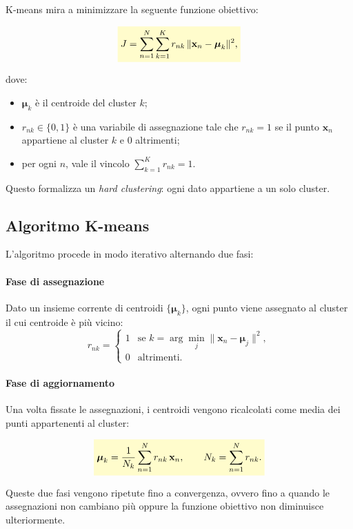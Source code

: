 \documentclass[a4paper,12pt]{report}
\newcommand{\highlight}[1]{%
\colorbox{yellow!20}{$\displaystyle #1$}%
}
\begin{document}
K-means mira a minimizzare la seguente funzione obiettivo:

\[
\highlight{
J = \sum_{n=1}^{N} \sum_{k=1}^{K} r_{nk} \, \lVert \mathbf{x}_n - \boldsymbol{\mu}_k \rVert^2,}
\]

dove:
\begin{itemize}
    \item $\boldsymbol{\mu}_k$ è il centroide del cluster $k$;
    \item $r_{nk} \in \{0,1\}$ è una variabile di assegnazione tale che $r_{nk}=1$ se il punto $\mathbf{x}_n$ appartiene al cluster $k$ e $0$ altrimenti;
    \item per ogni $n$, vale il vincolo $\sum_{k=1}^{K} r_{nk} = 1$.
\end{itemize}

Questo formalizza un \emph{hard clustering}: ogni dato appartiene a un solo cluster.

\subsection{Algoritmo K-means}

L’algoritmo procede in modo iterativo alternando due fasi:

\paragraph{Fase di assegnazione}
Dato un insieme corrente di centroidi $\{\boldsymbol{\mu}_k\}$, ogni punto viene assegnato al cluster il cui centroide è più vicino:
\[
r_{nk} =
\begin{cases}
1 & \text{se } k = \arg\min_j \lVert \mathbf{x}_n - \boldsymbol{\mu}_j \rVert^2, \\
0 & \text{altrimenti}.
\end{cases}
\]

\paragraph{Fase di aggiornamento}
Una volta fissate le assegnazioni, i centroidi vengono ricalcolati come media dei punti appartenenti al cluster:

\[
\highlight{
\boldsymbol{\mu}_k = \frac{1}{N_k} \sum_{n=1}^{N} r_{nk} \, \mathbf{x}_n,
\qquad
N_k = \sum_{n=1}^{N} r_{nk}.}
\]

Queste due fasi vengono ripetute fino a convergenza, ovvero fino a quando le assegnazioni non cambiano più oppure la funzione obiettivo non diminuisce ulteriormente.
\end{document}
